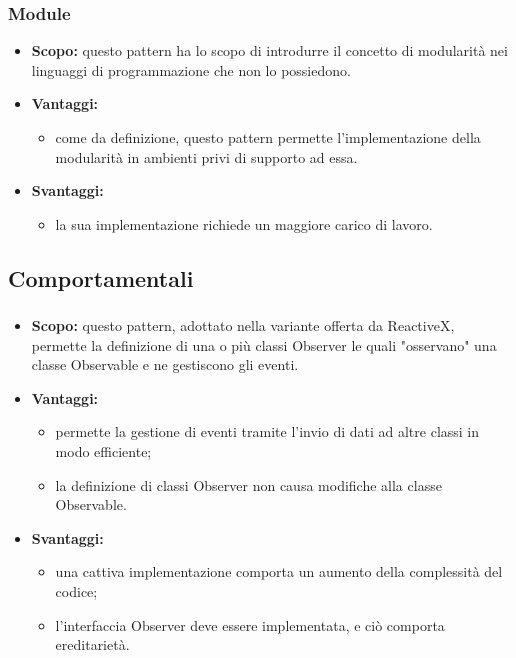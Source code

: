 	 \subsubsection{Module}
      \begin{itemize}
       \item \textbf{Scopo:} questo pattern ha lo scopo di introdurre il concetto di modularità nei linguaggi di programmazione che non lo possiedono.
	\item \textbf{Vantaggi:}
	  \begin{itemize}
	   \item come da definizione, questo pattern permette l'implementazione della modularità in ambienti privi di supporto ad essa.
	  \end{itemize}
	\item \textbf{Svantaggi:}
	  \begin{itemize}
	   \item la sua implementazione richiede un maggiore carico di lavoro.
	  \end{itemize}
	\end{itemize}
	  \newpage
  \subsection{Comportamentali}
    \subsubsection{}
      \begin{itemize}
       \item \textbf{Scopo:} questo pattern, adottato nella variante offerta da ReactiveX, permette la definizione di una o più classi Observer le quali "osservano" una classe Observable e ne gestiscono gli eventi.
	\item \textbf{Vantaggi:}
	  \begin{itemize}
	   \item permette la gestione di eventi tramite l'invio di dati ad altre classi in modo efficiente;
	   \item la definizione di classi Observer non causa modifiche alla classe Observable. 
	  \end{itemize}
	\item \textbf{Svantaggi:}
	  \begin{itemize}
	   \item una cattiva implementazione comporta un aumento della complessità del codice;
	   \item l'interfaccia Observer deve essere implementata, e ciò comporta ereditarietà.
	  \end{itemize}
	\end{itemize}
	
